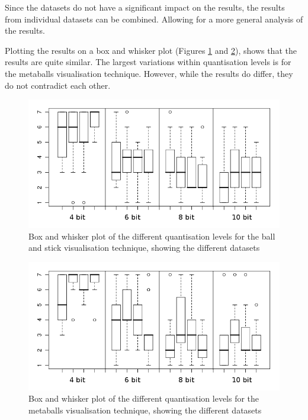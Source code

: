 Since the datasets do not have a significant impact on the results, the results
from individual datasets can be combined. Allowing for a more general analysis
of the results.

Plotting the results on a box and whisker plot (Figures
\ref{fig:results_boxwhisker_dataset_ballstick} and
\ref{fig:results_boxwhisker_dataset_metaballs}), shows that the results are
quite similar. The largest variations within quantisation levels is for the
metaballs visualisation technique. However, while the results do differ, they
do not contradict each other.

\begin{figure}[h!]
  \begin{center}
    \includegraphics[width=120mm]{boxwhisker_dataset_ballstick}
  \end{center}
  \caption{Box and whisker plot of the different quantisation levels for the
  ball and stick visualisation technique, showing the different datasets}
  \label{fig:results_boxwhisker_dataset_ballstick}
\end{figure}

\begin{figure}[h!]
  \begin{center}
    \includegraphics[width=120mm]{boxwhisker_dataset_metaballs}
  \end{center}
  \caption{Box and whisker plot of the different quantisation levels for the
  metaballs visualisation technique, showing the different datasets}
  \label{fig:results_boxwhisker_dataset_metaballs}
\end{figure}

